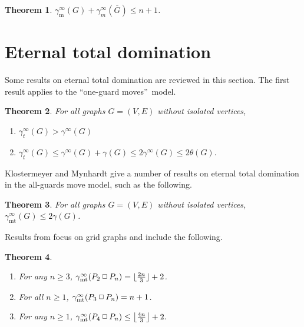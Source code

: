 \documentclass[12pt]{article}%
\newtheorem{theorem}{Theorem}[section]
\providecommand{\boksie}{\ensuremath{\mathbin{\raisebox{0.3mm}{$\scriptstyle\square$}}}}
\begin{document}
\begin{theorem}
\label{princenord}\emph{\cite{prince2}} $\gamma_{\mathrm{m}}^{\infty
}(G)+\gamma_{m}^{\infty}(\overline{G})\leq n+1$.
\end{theorem}

\section{Eternal total domination}

\label{Sec_ETD}

Some results on eternal total domination are reviewed in this section. The
first result applies to the \textquotedblleft one-guard
moves\textquotedblright\ model.

\begin{theorem}
\emph{\cite{KM4}} For all graphs $G=(V,E)$ without isolated vertices,

\begin{enumerate}
\item[\emph{(a)}] $\gamma_{t}^{\infty}(G)>\gamma^{\infty}(G)$

\item[\emph{(b)}] $\gamma_{t}^{\infty}(G)\leq\gamma^{\infty}(G)+\gamma
(G)\leq2\gamma^{\infty}(G)\leq2\theta(G).$
\end{enumerate}
\end{theorem}

Klostermeyer and Mynhardt give a number of results on eternal total domination
\cite{KM4} in the all-guards move model, such as the following.

\begin{theorem}
\emph{\cite{KM4}} \label{allmove} For all graphs $G=(V,E)$ without isolated
vertices, $\gamma_{\mathrm{\operatorname{mt}}}^{\infty}(G)\leq2\gamma(G)$.
\end{theorem}

Results from \cite{GK2} focus on grid graphs and include the following.

\begin{theorem}
\emph{\cite{GK2}\hspace{0.1in}}

\begin{enumerate}
\item[\emph{(a)}] For any $n\geq3$, $\gamma_{\mathrm{\operatorname{mt}}%
}^{\infty}(P_{2}\boksie P_{n})=\lfloor\frac{2n}{3}\rfloor+2$.

\item[\emph{(b)}] For all $n\geq1$, $\gamma_{\operatorname{mt}}^{\infty}%
(P_{3}\boksie P_{n})=n+1$.

\item[\emph{(c)}] For any $n\geq1$, $\gamma_{\operatorname{mt}}^{\infty}%
(P_{4}\boksie P_{n})\leq\left\lfloor \frac{4n}{3}\right\rfloor +2.$
\end{enumerate}
\end{theorem}
\end{document}
